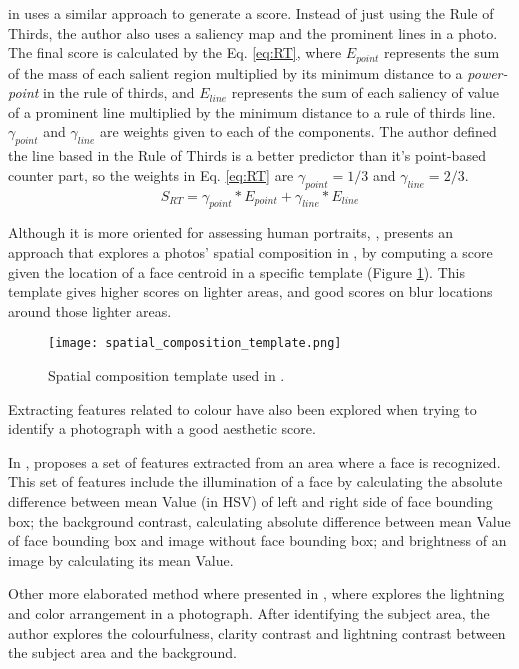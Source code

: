 \citeauthor{liu2010optimizing} in \cite{liu2010optimizing} uses a similar approach to generate a score. Instead of just using the Rule of Thirds, the author also uses a saliency map and the prominent lines in a photo. The final score is calculated by the Eq. \ref{eq:RT}, where $E_{point}$ represents the sum of the mass of each salient region multiplied by its minimum distance to a \emph{power-point} in the rule of thirds, and $E_{line}$ represents the sum of each saliency of value of a prominent line multiplied by the minimum distance to a rule of thirds line. $\gamma_{point}$ and $\gamma_{line}$ are weights given to each of the components. The author defined the line based in the Rule of Thirds is a better predictor than it's point-based counter part, so the weights in Eq. \ref{eq:RT} are $\gamma_{point} = 1/3$ and $\gamma_{line}=2/3$.
\begin{equation} \label{eq:RT}
	S_{RT} = \gamma_{point}*E_{point} + \gamma_ {line}*E_{line}
\end{equation}

Although it is more oriented for assessing human portraits, \citeauthor{khan2012evaluating}, presents an approach that explores a photos' spatial composition in \cite{khan2012evaluating}, by computing a score given the location of a face centroid in a specific template (Figure \ref{fig:khan_template_image}). This template gives higher scores on lighter areas, and good scores on blur locations around those lighter areas.

\begin{figure}[htbp]
    \centering
    \texttt{[image: spatial\_composition\_template.png]}
	\caption{Spatial composition template used in \cite{khan2012evaluating}.}
	\label{fig:khan_template_image}
\end{figure}


Extracting features related to colour have also been explored when trying to identify a photograph with a good aesthetic score.

In \cite{khan2012evaluating}, \citeauthor{khan2012evaluating} proposes a set of features extracted from an area where a face is recognized. This set of features include the illumination of a face by calculating the absolute difference between mean Value (in HSV) of left and right side of face bounding box; the background contrast, calculating absolute difference between mean Value of face bounding box and image without face bounding box; and brightness of an image by calculating its mean Value.

Other more elaborated method where presented in \cite{luo2011content}, where \citeauthor{luo2011content} explores the lightning and color arrangement in a photograph. After identifying the subject area, the author explores the colourfulness, clarity contrast and lightning contrast between the subject area and the background.



